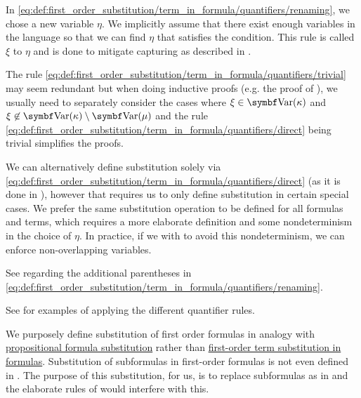 \begin{definition}
\begin{DefEnum}
    In \eqref{eq:def:first_order_substitution/term_in_formula/quantifiers/renaming}, we chose a new variable \( \eta \). We implicitly assume that there exist enough variables in the language so that we can find \( \eta \) that satisfies the condition. This rule is called  \( \xi \) to \( \eta \) and is done to mitigate capturing as described in .

    The rule \eqref{eq:def:first_order_substitution/term_in_formula/quantifiers/trivial} may seem redundant but when doing inductive proofs (e.g. the proof of ), we usually need to separately consider the cases where \( \xi \in \Bold{Var}(\kappa) \) and \( \xi \not\in \Bold{Var}(\kappa) \setminus \Bold{Var}(\mu) \) and the rule \eqref{eq:def:first_order_substitution/term_in_formula/quantifiers/direct} being trivial simplifies the proofs.

    We can alternatively define substitution solely via \eqref{eq:def:first_order_substitution/term_in_formula/quantifiers/direct} (as it is done in \cite[def. 14.25]{OpenLogic20201202}), however that requires us to only define substitution in certain special cases. We prefer the same substitution operation to be defined for all formulas and terms, which requires a more elaborate definition and some nondeterminism in the choice of \( \eta \). In practice, if we with to avoid this nondeterminism, we can enforce non-overlapping variables.

    See  regarding the additional parentheses in \eqref{eq:def:first_order_substitution/term_in_formula/quantifiers/renaming}.

    See  for examples of applying the different quantifier rules.

     We purposely define substitution of first order formulas in analogy with \hyperref[def:propositional_substitution/single]{propositional formula substitution} rather than \hyperref[def:first_order_substitution/term_in_formula]{first-order term substitution in formulas}. Substitution of subformulas in first-order formulas is not even defined in \cite{OpenLogic20201202}. The purpose of this substitution, for us, is to replace subformulas as in  and the elaborate rules of  would interfere with this.


\end{DefEnum}
\end{definition}
